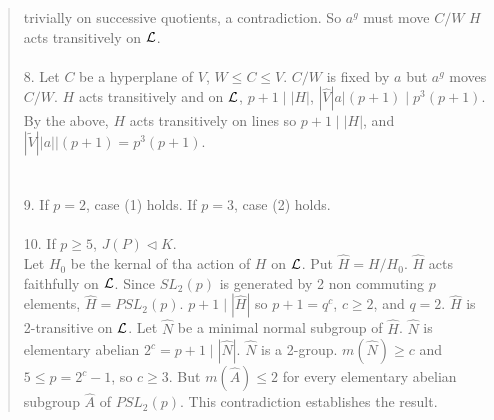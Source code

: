 \begin{quote}
trivially on successive quotients, a contradiction.  So $a^g$ must move $C/W$ 
$H$ acts transitively on ${\cal L}$.
\\
\\
8. Let $C$ be a hyperplane of $V$, $W \leq C \leq V$. $C/W$ is fixed by $a$ but $a^g$ moves $C/W$.  $H$ acts transitively and
on ${\cal L}$, $p+1 \mid |H|$, $|{\hat V} |a| (p+1) \mid p^3 (p+1)$.\\
By the above, $H$ acts transitively on lines so $p+1 \mid |H|$, and
$|{\tilde V}| |a| |(p+1) = p^3 (p+1)$.\\
\\
\\
9. If $p=2$, case (1) holds.  If $p=3$, case (2) holds.
\\
\\
10. If $p\geq 5$, $J(P) \lhd K$.\\
Let $H_0$ be the kernal of tha action of $H$ on ${\cal L}$. Put ${\hat H} = H/H_0$. ${\hat H}$ acts faithfully on ${\cal L}$.
Since $SL_2(p)$ is generated by 2 non commuting $p$ elements, ${\hat H} = PSL_2(p)$.   $p+1 \mid |{\hat H}|$ so $p+1=q^c$, $c \geq 2$,
and $q=2$.
${\hat H}$ is 2-transitive on ${\cal L}$.  Let ${\hat N}$ be a minimal normal subgroup of ${\hat H}$.  ${\hat N}$ is elementary
abelian $2^c=p+1 \mid |{\hat N}|$. ${\hat N}$ is a 2-group. $m({\hat N}) \geq c$ and
$5 \leq p= 2^c-1$, so $c \geq 3$.  But $m({\hat A}) \leq 2$ for every elementary abelian subgroup ${\hat A}$ of $PSL_2(p)$.  This contradiction
establishes the result.
\end{quote}
